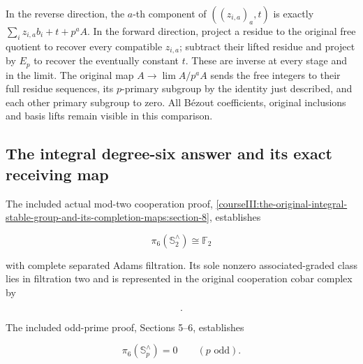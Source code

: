 In the reverse direction, the \(a\)-th component of \(((z_{i,a})_a,t)\) is exactly \(\sum_i z_{i,a}b_i+t+p^aA\). In the forward direction, project a residue to the original free quotient to recover every compatible \(z_{i,a}\); subtract their lifted residue and project by \(E_p\) to recover the eventually constant \(t\). These are inverse at every stage and in the limit. The original map \(A\to\lim A/p^aA\) sends the free integers to their full residue sequences, its \(p\)-primary subgroup by the identity just described, and each other primary subgroup to zero. All Bézout coefficients, original inclusions and basis lifts remain visible in this comparison.

\subsection{The integral degree-six answer and its exact receiving map}
\label{courseIII:the-original-integral-stable-group-and-its-completion-maps:integral-degree-six-answer}

\label{courseIII:the-original-integral-stable-group-and-its-completion-maps:section-7}\label{courseIII:integral-stable:7}

The included actual mod-two cooperation proof, \cref{courseIII:the-original-integral-stable-group-and-its-completion-maps:section-8}, establishes

\begin{equation}
\pi_6(\mathbb S^{\wedge}_2)\cong\mathbb F_2
 \label{courseIII:the-original-integral-stable-group-and-its-completion-maps:eq:7.1}
\end{equation}

with complete separated Adams filtration. Its sole nonzero associated-graded class lies in filtration two and is represented in the original cooperation cobar complex by

\begin{equation}
[\,(\xi_1^{\mathrm{act}})^4\mid(\xi_1^{\mathrm{act}})^4\,].
 \label{courseIII:the-original-integral-stable-group-and-its-completion-maps:eq:7.2}
\end{equation}

The included odd-prime proof, Sections 5--6, establishes

\begin{equation}
\pi_6(\mathbb S^{\wedge}_p)=0\qquad(p\text{ odd}).
 \label{courseIII:the-original-integral-stable-group-and-its-completion-maps:eq:7.3}
\end{equation}

